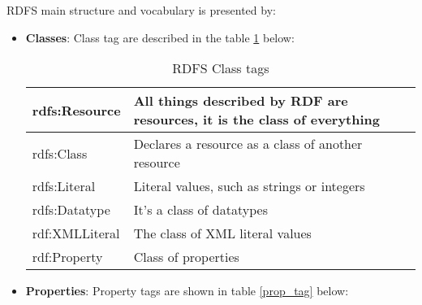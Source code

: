 \noindent RDFS main structure and vocabulary is presented by:
\begin{itemize}
    \setlength{\itemsep}{0cm}
    \setlength{\parskip}{0cm}

\item \textbf{Classes}: Class tag are described in the table \ref{class_tag} below:
\begin{table}[H]
\centering
\caption{RDFS Class tags}
\label{class_tag}
\begin{tabular}{|l|l|}
\hline
rdfs:Resource  & All things described by RDF are resources, it is the class of everything \\ \hline
rdfs:Class     & Declares a resource as a class of another resource                       \\ \hline
rdfs:Literal   & Literal values, such as strings or integers                              \\ \hline
rdfs:Datatype  & It's a class of datatypes                                                \\ \hline
rdf:XMLLiteral & The class of XML literal values                                          \\ \hline
rdf:Property   & Class of properties                                                      \\ \hline
\end{tabular}
\end{table}


    \item \textbf{Properties}: Property tags are shown in table \ref{prop_tag} below:
    

\end{itemize}
